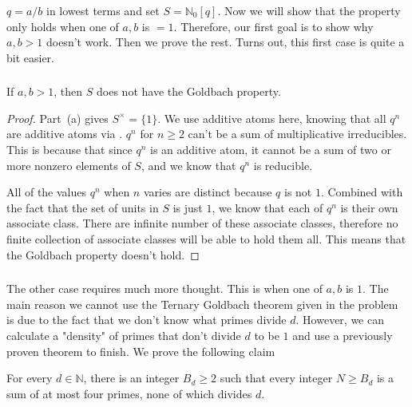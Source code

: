 \documentclass[11pt]{scrartcl}
\begin{document}
\begin{soln}
	$q=a/b$ in lowest terms and set $S=\mathbb N_0[q]$. Now we will show that the property only holds when one of $a,b$ is 
	$=1$. Therefore, our first goal is to show why $a,b > 1$ doesn't work.
	Then we prove the rest. Turns out, this first case is quite a bit easier. 
    \subsubsection*{}

    \begin{claim*}
        If $a,b>1$, then $S$ does not have the Goldbach property.
    \end{claim*}

    \begin{proof}
        Part~(a) gives $S^\times=\{1\}$. We use additive atoms here, knowing 
        that all $q^n$ are additive atoms via \cite[Theorem~2.3(3)]{p7-chapman-gotti-gotti}.
        $q^n$ for $n\geq 2$ can't be a sum of multiplicative irreducibles.
        This is because that since $q^n$ is an additive atom, it cannot be a sum of
        two or more nonzero elements of $S$, and we know that $q^n$ is reducible. 


		All of the values $q^n$ when $n$ varies are distinct because $q$ is not $1$.
        Combined with the fact that the set of units in $S$ is just $1$, 
        we know that each of $q^n$ is their own associate class. There are infinite number of these associate 
		classes, therefore no finite collection of associate classes will be able to hold
		 them all. This means that the Goldbach property doesn't hold.
    \end{proof}

    \subsubsection*{}

	The other case requires much more thought. This is when one of $a,b$ 
	is $1$. The main reason we cannot use the Ternary Goldbach theorem given in the problem is due to the fact that we don't know what 
	primes divide $d$. However, we can calculate a "density" of primes that 
    don't divide $d$ to be $1$
	and use a previously proven theorem to finish. 
	We prove the following claim

    \begin{claim*}
        For every $d\in\mathbb N$, there is an integer $B_d\ge2$
        such that every integer $N\ge B_d$ is a sum of at most
        four primes, none of which divides $d$.
    \end{claim*}


\end{soln}
\end{document}
